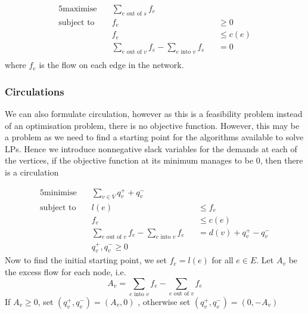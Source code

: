 \documentclass{article}
\theoremstyle{plain}
\theoremstyle{definition}
\begin{document}
            \begin{alignat*}{5}
            \text{maximise} &\quad \sum_{e \text{ out of } s}f_e && \\
            \text{subject to} &\quad f_e &&\geq 0  \tag{for each $e \in E$} \\
            &\quad f_e &&\leq c(e) \tag{for each $e \in E$} \\
            &\quad \sum_{e \text{ out of } v}f_e - \sum_{e \text{ into } v} f_e &&= 0 \\
            \end{alignat*}
            where $f_e$ is the flow on each edge in the network.
        \subsubsection{Circulations}
            We can also formulate circulation, however as this is a feasibility problem instead of an optimisation problem, there is no objective function. However, this may be a problem as we need to find a starting point for the algorithms available to solve LPs. Hence we introduce nonnegative slack variables for the demands at each of the vertices, if the objective function at its minimum manages to be $0$, then there is a circulation

            \begin{alignat*}{5}
            \text{minimise} &\quad \sum_{v \in V} q_v^+ + q_v^- && \\
            \text{subject to} &\quad l(e) &&\leq f_e  \tag{for each $e \in E$} \\
            &\quad f_e &&\leq c(e)  \tag{for each $e \in E$} \\
            &\quad \sum_{e \text{ out of } v}f_e - \sum_{e \text{ into } v} f_e &&= d(v) + q_v^+ - q_v^- \tag{for each $v \in V$} \\
            &\quad q_v^+, q_v^- \geq 0 \tag{for each $v \in V$}
            \end{alignat*}
            Now to find the initial starting point, we set $f_e = l(e)$ for all $e \in E$. Let $A_v$ be the excess flow for each node, i.e.
            \[ A_v = \sum_{e \text{ into } v} f_e - \sum_{e \text{ out of } v}f_e \]
            If $A_v \geq 0$, set $(q_v^+, q_v^-) = (A_v, 0)$ , otherwise set $(q_v^+, q_v^-) = (0, -A_v)$
\end{document}
